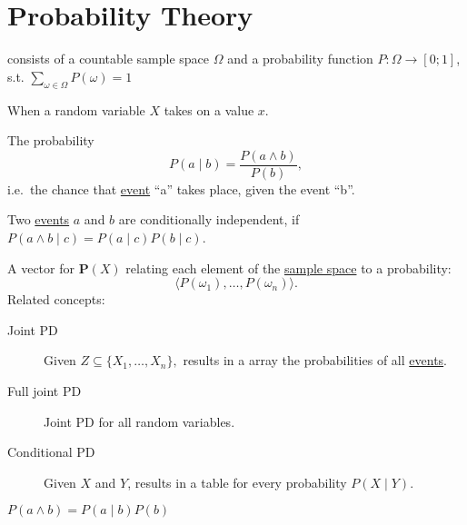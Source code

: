 \documentclass{article}
\begin{document}
\section{Probability Theory}

\begin{definition}\label{def:prob-model}
  consists of a countable sample space $\Omega$ and a
  probability function $P : \Omega \rightarrow [0;1]$,
  s.t. $\sum_{\omega \in \Omega} P(\omega) = 1$
\end{definition}

\begin{definition}[Event]\label{def:event}
  When a random variable $X$ takes on a value $x$.
\end{definition}

\begin{definition}\label{def:cond-prob} The probability
  \[ P(a \mid b) = \frac{P(a \land b)}{P(b)}, \] i.e.\ the chance that
  \hyperref[def:event]{event} ``a'' takes place, given the event
  ``b''.
\end{definition}

\begin{definition}\label{def:cond-indep}
  Two \hyperref[def:event]{events} $a$ and $b$ are conditionally
  independent, if $P(a \land b \mid c) = P(a \mid c) P(b \mid c)$.
\end{definition}

\begin{definition}\label{def:prob-dist}
  A vector for $\mathbf{P}(X)$ relating each element of the
  \hyperref[def:prob-model]{sample space} to a probability:
  \[ \langle P(\omega_1), \dots, P(\omega_n) \rangle. \] Related
  concepts:
  \begin{description}
  \item[Joint PD]\label{def:jpd} Given
    $Z \subseteq \{ X_1, \dots, X_n \},$ results in a array the
    probabilities of all \hyperref[def:event]{events}.
  \item[Full joint PD]\label{def:fjdp}
    Joint PD for all random variables.
  \item[Conditional PD]\label{def:cpd}
    Given $X$ and $Y$, results in a table for
    every probability $P(X \mid Y)$.
  \end{description}
\end{definition}

\begin{definition}\label{def:prod-rule}
  $P(a \land b) = P(a \mid b) P(b)$
\end{definition}
\end{document}
